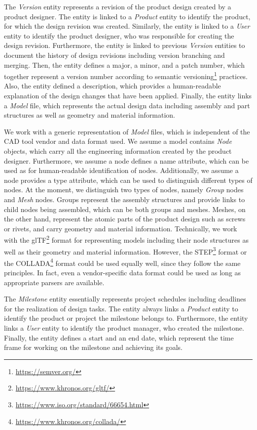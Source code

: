 The \textit{Version} entity represents a revision of the product design created by a product designer.
The entity is linked to a \textit{Product} entity to identify the product, for which the design revision was created.
Similarly, the entity is linked to a \textit{User} entity to identify the product designer, who was responsible for creating the design revision.
Furthermore, the entity is linked to previous \textit{Version} entities to document the history of design revisions including version branching and merging.
Then, the entity defines a major, a minor, and a patch number, which together represent a version number according to semantic versioning\footnote{\url{https://semver.org/}} practices.
Also, the entity defined a description, which provides a human-readable explanation of the design changes that have been applied.
Finally, the entity links a \textit{Model} file, which represents the actual design data including assembly and part structures as well as geometry and material information.

We work with a generic representation of \textit{Model} files, which is independent of the CAD tool vendor and data format used.
We assume a model contains \textit{Node} objects, which carry all the engineering information created by the product designer.
Furthermore, we assume a node defines a name attribute, which can be used as for human-readable identification of nodes.
Additionally, we assume a node provides a type attribute, which can be used to distinguish different types of nodes.
At the moment, we distinguish two types of nodes, namely \textit{Group} nodes and \textit{Mesh} nodes.
Groups represent the assembly structures and provide links to child nodes being assembled, which can be both groups and meshes.
Meshes, on the other hand, represent the atomic parts of the product design such as screws or rivets, and carry geometry and material information.
Technically, we work with the glTF\footnote{\url{https://www.khronos.org/gltf/}} format for representing models including their node structures as well as their geometry and material information.
However, the STEP\footnote{\url{https://www.iso.org/standard/66654.html}} format or the COLLADA\footnote{\url{https://www.khronos.org/collada/}} format could be used equally well, since they follow the same principles.
In fact, even a vendor-specific data format could be used as long as appropriate parsers are available.

The \textit{Milestone} entity essentially represents project schedules including deadlines for the realization of design tasks.
The entity always links a \textit{Product} entity to identify the product or project the milestone belongs to.
Furthermore, the entity links a \textit{User} entity to identify the product manager, who created the milestone.
Finally, the entity defines a start and an end date, which represent the time frame for working on the milestone and achieving its goals.

